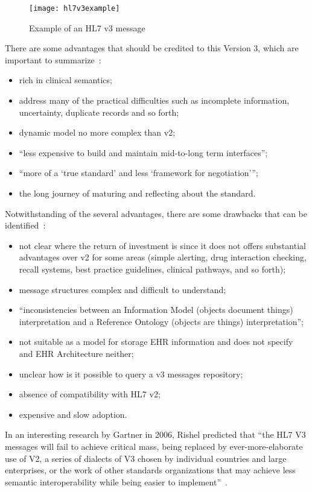 \begin{figure}[t]
\centering
\texttt{[image: hl7v3example]}
\caption[Example of an HL7 v3 message]{Example of an HL7 v3 message~\citep{Spronk2007}}
\label{fig:hl7v3example}
\end{figure}

There are some advantages that should be credited to this Version 3, which are important to summarize~\citep{Atalag2010,Shaver2010}:
\begin{itemize}
\item rich in clinical semantics;
\item address many of the practical difficulties such as incomplete information, uncertainty, duplicate records and so forth;
\item dynamic model no more complex than v2;
\item ``less expensive to build and maintain mid-to-long term interfaces'';
\item ``more of a `true standard' and less `framework for negotiation''';
\item the long journey of maturing and reflecting about the standard.
\end{itemize}

Notwithstanding of the several advantages, there are some drawbacks that can be identified~\citep{Atalag2010,Shaver2010}:
\begin{itemize}
\item not clear where the return of investment is since it does not offers substantial advantages over v2 for some areas (simple alerting, drug interaction checking, recall systems, best practice guidelines, clinical pathways, and so forth);
\item message structures complex and difficult to understand;
\item ``inconsistencies between an Information Model (objects document things) interpretation and a Reference Ontology (objects are things) interpretation'';
\item not suitable as a model for storage EHR information and does not specify and EHR Architecture neither;
\item unclear how is it possible to query a v3 messages repository;
\item absence of compatibility with HL7 v2; 
\item expensive and slow adoption.
\end{itemize}

In an interesting research by Gartner in 2006, Rishel predicted that ``the HL7 V3 messages will fail to achieve critical mass, being replaced by ever-more-elaborate use of V2, a series of dialects of V3 chosen by individual countries and large enterprises, or the work of other standards organizations that may achieve less semantic interoperability while being easier to implement''~\citep{Rishel2006}.


